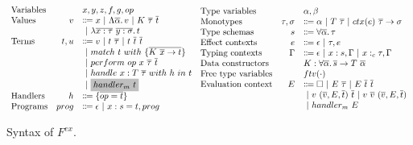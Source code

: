 \documentclass[acmsmall]{acmart}
\newcommand{\graybox}[1]{\colorbox{lightgray}{$\displaystyle #1$}}
\newcommand{\vor}{~|~}
\newcommand{\ap}{~}
\newcommand{\ctx}[1]{ctx(#1)~}
\begin{document}
\begin{figure}
    \centering
    \[
        \begin{array}{lrll}
            \text{Variables} & & x, y, z, f, g, op \\
            \text{Values} &v &\Coloneqq x \vor \Lambda \overline{\alpha} \ldotp v \vor K\ap \overline{\tau} \ap \overline{t} \\
            &&\vor \lambda \overline{x : \tau}~\overline{y : \sigma}\ldotp t
            \\
            \text{Terms} &t, u &\Coloneqq v \vor t\ap\overline{\tau} \vor t \ap \overline{t} \ap \overline{t} \\
            &&\vor match ~ t ~ with ~\{\overline{K \ap \overline{x} \to t}\} \\
            &&\vor perform ~ op \ap x \ap \overline{\tau} \ap \overline{t} \\
            &&\vor handle ~ x : T \ap \overline{\tau} ~with ~h~in ~t \\
            &&\vor \graybox{handler_m ~ t}
            \\
            \text{Handlers} &h &\Coloneqq \{ \overline{op = t} \}
            \\
            \text{Programs} &prog &\Coloneqq \epsilon \vor x : s = t, prog
        \end{array}
        \begin{array}{lrl}
            \text{Type variables} && \alpha, \beta \\
            \text{Monotypes} & \tau, \sigma &\Coloneqq \alpha \vor T \ap \overline{\tau} \vor \ctx{e} \overline{\tau} \to \sigma \\
            \text{Type schemas} & s &\Coloneqq \forall\overline{\alpha}\ldotp \tau \\
            \text{Effect contexts} & e &\Coloneqq \epsilon\vor \tau, e \\
            \text{Typing contexts} & \Gamma &\Coloneqq \epsilon \vor x : s, \Gamma \vor x :_c \tau, \Gamma \\
            \text{Data constructors} & & K : \forall\overline{\alpha}\ldotp \overline{s}\to T\ap \overline{\alpha} \\
            \text{Free type variables} & & ftv(\cdot) \\
            \text{Evaluation context} &E &\Coloneqq \square \vor E \ap \overline{\tau} \vor E \ap \overline{t}\ap \overline{t} \\
            &&\vor v \ap (\overline{v}, E, \overline{t}) \ap \overline{t} \vor v \ap \overline{v} \ap (\overline{v}, E, \overline{t}) \\
            &&\vor handler_m ~ E
        \end{array}
    \]
    \caption{Syntax of $F^{ex}$.}
    \label{fig:core-syntax}
\end{figure}
\end{document}
